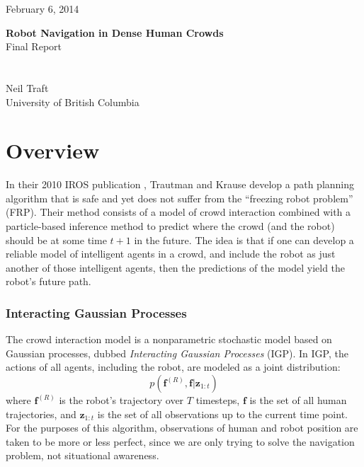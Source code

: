 \documentclass[a4paper,11pt,headings=small]{article}
\begin{document}
  \vspace{-1cm}
	\begin{flushright}
	February 6, 2014\\
	\end{flushright}
	\vspace{0.6cm}
	\LARGE{\textbf{Robot Navigation in Dense Human Crowds}\\[0.2cm] Final Report}\\\\ \\
	\large{Neil Traft\\[0.1cm] University of British Columbia}		 	 	\vspace{0.6cm}


\pagestyle{fancy}
\fancyhf{}

\setcounter{page}{1}

\renewcommand{\thesection}{\Roman{section}}
\thispagestyle{empty}

\newcommand{\f}{\mathbf{f}}
\newcommand{\fr}{\f^{(R)}}
\newcommand{\fati}{\f^{(i)}}
\newcommand{\fatj}{\f^{(j)}}
\newcommand{\samplej}{(\fatj)_i}
\newcommand{\z}{\mathbf{z}}
\newcommand{\ztot}{\z_{1:t}}
\newcommand{\pos}{\mathrm{pos}}
\newcommand{\post}{\pos^{(i)}_t}

\section*{Overview}
\quad In their 2010 IROS publication \cite{Trautman2010}, Trautman and Krause develop a path planning algorithm that is safe and yet does not suffer from the ``freezing robot problem'' (FRP). Their method consists of a model of crowd interaction combined with a particle-based inference method to predict where the crowd (and the robot) should be at some time $t+1$ in the future. The idea is that if one can develop a reliable model of intelligent agents in a crowd, and include the robot as just another of those intelligent agents, then the predictions of the model yield the robot's future path.

\subsubsection*{Interacting Gaussian Processes}
\quad The crowd interaction model is a nonparametric stochastic model based on Gaussian processes, dubbed \emph{Interacting Gaussian Processes} (IGP). In IGP, the actions of all agents, including the robot, are modeled as a joint distribution:
$$p(\fr,\f|\ztot)$$
where $\fr$ is the robot's trajectory over $T$ timesteps, $\f$ is the set of all human trajectories, and $\ztot$ is the set of all observations up to the current time point. For the purposes of this algorithm, observations of human and robot position are taken to be more or less perfect, since we are only trying to solve the navigation problem, not situational awareness.
\end{document}
